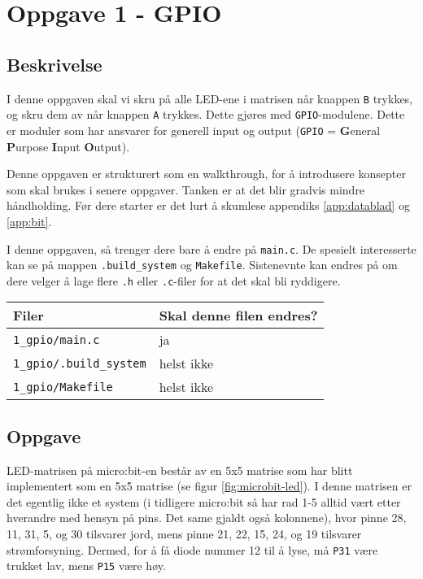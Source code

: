 \section{Oppgave 1 - GPIO}\label{sec:3-oppgave-GPIO}


\subsection{Beskrivelse}



I denne oppgaven skal vi skru på alle LED-ene i matrisen når knappen \verb|B| trykkes, og skru dem av når knappen \verb|A| trykkes. Dette gjøres med \verb|GPIO|-modulene. Dette er moduler som har ansvarer for generell input og output (\verb|GPIO| = \textbf{G}eneral \textbf{P}urpose \textbf{I}nput \textbf{O}utput).

Denne oppgaven er strukturert som en walkthrough, for å introdusere konsepter som skal brukes i senere oppgaver. Tanken er at det blir gradvis mindre håndholding. Før dere starter er det lurt å skumlese appendiks \ref{app:datablad} og \ref{app:bit}.

I denne oppgaven, så trenger dere bare å endre på \verb|main.c|. De spesielt interesserte kan se på mappen \verb|.build_system| og \verb|Makefile|. Sistenevnte kan endres på om dere velger å lage flere \verb|.h| eller \verb|.c|-filer for at det skal bli ryddigere.

\begin{center}
 \begin{tabular}{|p{8.5cm} p{5.5cm}|} 
 \hline
 Filer & Skal denne filen endres?  \\ [0.5ex] 
 \hline\hline
 \verb|1_gpio/main.c| & \quad \quad \quad \quad ja  \\ 
 \hline
  \verb|1_gpio/.build_system| &  \quad \quad \quad \quad helst ikke \\ 
 \hline
 \verb|1_gpio/Makefile| &  \quad \quad \quad \quad helst ikke \\ 
 \hline
\end{tabular}
\end{center}


\subsection{Oppgave}

LED-matrisen på micro:bit-en består av en 5x5 matrise som har blitt implementert som en 5x5 matrise (se figur \ref{fig:microbit-led}). I denne matrisen er det egentlig ikke et system (i tidligere micro:bit så har rad 1-5 alltid vært etter hverandre med hensyn på pins. Det same gjaldt også kolonnene), hvor pinne 28, 11, 31, 5, og 30 tilsvarer jord, mens pinne 21, 22, 15, 24, og 19 tilsvarer  strømforsyning. Dermed, for å få diode nummer 12 til å lyse, må \verb|P31| være trukket lav, mens \verb|P15| være høy.

